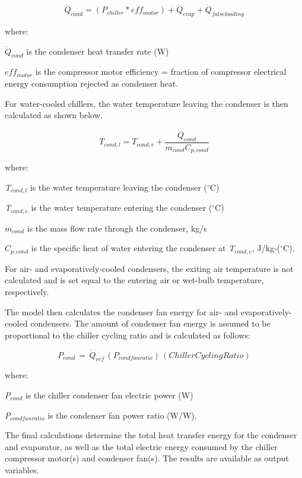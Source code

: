 \begin{equation}
{\dot{Q}_{cond}} = \left( {{P_{chiller}} * ef{f_{motor}}} \right) + {\dot{Q}_{evap}} + {\dot{Q}_{falseloading}}
\end{equation}

where:

\({\dot{Q}_{cond}}\) is the condenser heat transfer rate (W)

\(ef{f_{motor}}\) is the compressor motor efficiency = fraction of compressor electrical energy consumption rejected as condenser heat.

For water-cooled chillers, the water temperature leaving the condenser is then calculated as shown below.

\begin{equation} 
  T_{cond,l} = T_{cond,e} + \frac{\dot{Q}_{cond}}{\dot{m}_{cond}C_{p,cond}}
\end{equation}

where:

\emph{T\(_{cond,l}\)} is the water temperature leaving the condenser (\(^{\circ}\)C)

\emph{T\(_{cond,e}\)} is the water temperature entering the condenser (\(^{\circ}\)C)

\({\dot{m}_{cond}}\) is the mass flow rate through the condenser, kg/s

\({C_{p,cond}}\) is the specific heat of water entering the condenser at \emph{T\(_{cond,e}\)}, J/kg-(\(^{\circ}\)C).

For air- and evaporatively-cooled condensers, the exiting air temperature is not calculated and is set equal to the entering air or wet-bulb temperature, respectively.

The model then calculates the condenser fan energy for air- and evaporatively-cooled condensers. The amount of condenser fan energy is assumed to be proportional to the chiller cycling ratio and is calculated as follows:

\begin{equation}
{P_{cond}}\, = \,{\dot{Q}_{ref}}\,\left( {{P_{condfanratio}}} \right)\,\left( {ChillerCyclingRatio} \right)
\end{equation}

where:

\emph{P\(_{cond}\)} is the chiller condenser fan electric power (W)

\emph{P\(_{condfanratio}\)} is the condenser fan power ratio (W/W).

The final calculations determine the total heat transfer energy for the condenser and evaporator, as well as the total electric energy consumed by the chiller compressor motor(s) and condenser fan(s). The results are available as output variables.


